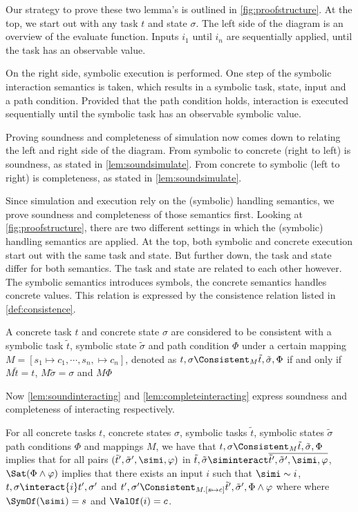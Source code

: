 Our strategy to prove these two lemma's is outlined in \cref{fig:proofstructure}.
At the top, we start out with any task $t$ and state $\sigma$.
The left side of the diagram is an overview of the evaluate function.
Inputs $i_1$ until $i_n$ are sequentially applied, until the task has an observable value.

On the right side, symbolic execution is performed.
One step of the symbolic interaction semantics is taken, which results in a symbolic task, state, input and a path condition.
Provided that the path condition holds, interaction is executed sequentially until the symbolic task has an observable symbolic value.

Proving soundness and completeness of simulation now comes down to relating the left and right side of the diagram.
From symbolic to concrete (right to left) is soundness, as stated in \cref{lem:soundsimulate}.
From concrete to symbolic (left to right) is completeness, as stated in \cref{lem:soundsimulate}.

Since simulation and execution rely on the (symbolic) handling semantics,
we prove soundness and completeness of those semantics first.
Looking at \cref{fig:proofstructure}, there are two different settings in which the (symbolic) handling semantics are applied.
At the top, both symbolic and concrete execution start out with the same task and state.
But further down, the task and state differ for both semantics.
The task and state are related to each other however.
The symbolic semantics introduces symbols, the concrete semantics handles concrete values.
This relation is expressed by the consistence relation listed in \cref{def:consistence}.

\begin{definition}
  \label{def:consistence}
  A concrete task $t$ and concrete state $\sigma$
  are considered to be consistent with a symbolic task $\tilde{t}$, symbolic state $\tilde{\sigma}$ and path condition $\Phi$
  under a certain mapping $M=[s_1\mapsto c_1,\cdots,s_n,\mapsto c_n]$, denoted as $t,\sigma \Consistent_M \tilde{t},\tilde{\sigma},\Phi$
  if and only if $M\tilde{t}=t$, $M\tilde{\sigma}=\sigma$ and $M\Phi$
\end{definition}

Now \cref{lem:soundinteracting} and \cref{lem:completeinteracting} express soundness and completeness of interacting respectively.

\begin{lemma}
  \label{lem:soundinteracting}
  For all concrete tasks $t$, concrete states $\sigma$, symbolic tasks $\tilde{t}$, symbolic states $\tilde{\sigma}$ path conditions $\Phi$ and mappings $M$,
  we have that $t,\sigma\Consistent_M\tilde{t},\tilde{\sigma},\Phi$ implies
  that for all pairs $(\tilde{t}',\tilde{\sigma}',\simi,\phi)$ in $\tilde{t},\tilde{\sigma}\siminteract\overline{\tilde{t}',\tilde{\sigma}',\simi,\phi}$,
  $\Sat(\Phi\land\phi)$ implies that there exists an input $i$ such that $\simi\sim i$,  $t,\sigma\interact{i}t',\sigma'$ and $t',\sigma' \Consistent_{M.[s\mapsto c]} \tilde{t}',\tilde{\sigma}',\Phi\land\phi$ where where $\SymOf(\simi)=s$ and $\ValOf(i)=c$.
\end{lemma}

